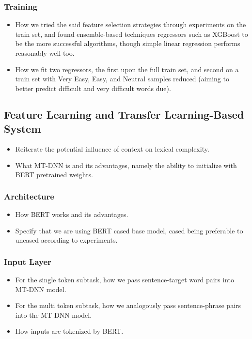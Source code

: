 \documentclass[11pt,a4paper]{article}
\begin{document}
\subsubsection{Training}

\begin{itemize}
  \item How we tried the said feature selection strategies through experiments on the train set, and found ensemble-based techniques regressors such as XGBoost to be the more successful algorithms, though simple linear regression performs reasonably well too.
  \item How we fit two regressors, the first upon the full train set, and second on a train set with Very Easy, Easy, and Neutral samples reduced (aiming to better predict difficult and very difficult words due).
\end{itemize}

\subsection{Feature Learning and Transfer Learning-Based System}
\begin{itemize}
  \item Reiterate the potential influence of context on lexical complexity.
  \item What MT-DNN is and its advantages, namely the ability to initialize with BERT pretrained weights.
\end{itemize}

\subsubsection{Architecture}
\begin{itemize}
  \item How BERT works and its advantages.
  \item Specify that we are using BERT cased base model, cased being preferable to uncased according to experiments.
\end{itemize}

\subsubsection{Input Layer}
\begin{itemize}
  \item For the single token subtask, how we pass sentence-target word pairs into MT-DNN model.
  \item For the multi token subtask, how we analogously pass sentence-phrase pairs into the MT-DNN model.
  \item How inputs are tokenized by BERT.
\end{itemize}
\end{document}
